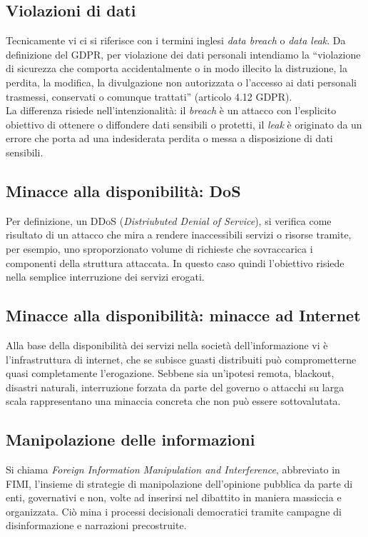 \documentclass[12pt,a4paper,openright,twoside]{report}
\begin{document}
\subsection{Violazioni di dati}
Tecnicamente vi ci si riferisce con i termini inglesi \textit{data breach} o \textit{data leak}.  
Da definizione del GDPR, per violazione dei dati personali intendiamo la ``violazione di sicurezza che comporta accidentalmente o in modo illecito la distruzione, la perdita, la modifica, la divulgazione non autorizzata o l'accesso ai dati personali trasmessi, conservati o comunque trattati'' (articolo 4.12 GDPR). \\
La differenza risiede nell'intenzionalità: il \textit{breach} \`e un attacco con l'esplicito obiettivo di ottenere o diffondere dati sensibili o protetti, il \textit{leak} è originato da un errore che porta ad una indesiderata perdita o messa a disposizione di dati sensibili. \\

\subsection{Minacce alla disponibilit\`a: DoS}
Per definizione, un DDoS (\textit{Distriubuted Denial of Service}), si verifica come risultato di un attacco che mira a rendere inaccessibili servizi o risorse tramite, per esempio, uno sproporzionato volume di richieste che sovraccarica i componenti della struttura attaccata.
In questo caso quindi l'obiettivo risiede nella semplice interruzione dei servizi erogati.\\

\subsection{Minacce alla disponibilit\`a: minacce ad Internet}
Alla base della disponibilit\`a dei servizi nella societ\`a dell'informazione vi \`e l'infrastruttura di internet, che se subisce guasti distribuiti pu\`o comprometterne quasi completamente l'erogazione. Sebbene sia un'ipotesi remota,  blackout, disastri naturali, interruzione forzata da parte del governo o attacchi su larga scala rappresentano una minaccia concreta che non pu\`o essere sottovalutata.\\

\subsection{Manipolazione delle informazioni}
Si chiama \textit{Foreign Information Manipulation and Interference}, abbreviato in FIMI, l'insieme di strategie di manipolazione dell'opinione pubblica da parte di enti, governativi e non, volte ad inserirsi nel dibattito in maniera massiccia e organizzata. Ci\`o mina i processi decisionali democratici tramite campagne di disinformazione e narrazioni precostruite.\\
\end{document}

